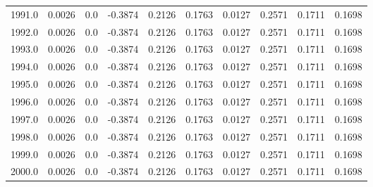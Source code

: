 \begin{longtable}{lrrrrrrrrr}
1991.0 & 0.0026 & 0.0 & -0.3874 & 0.2126 & 0.1763 & 0.0127 & 0.2571 & 0.1711 & 0.1698 \\
1992.0 & 0.0026 & 0.0 & -0.3874 & 0.2126 & 0.1763 & 0.0127 & 0.2571 & 0.1711 & 0.1698 \\
1993.0 & 0.0026 & 0.0 & -0.3874 & 0.2126 & 0.1763 & 0.0127 & 0.2571 & 0.1711 & 0.1698 \\
1994.0 & 0.0026 & 0.0 & -0.3874 & 0.2126 & 0.1763 & 0.0127 & 0.2571 & 0.1711 & 0.1698 \\
1995.0 & 0.0026 & 0.0 & -0.3874 & 0.2126 & 0.1763 & 0.0127 & 0.2571 & 0.1711 & 0.1698 \\
1996.0 & 0.0026 & 0.0 & -0.3874 & 0.2126 & 0.1763 & 0.0127 & 0.2571 & 0.1711 & 0.1698 \\
1997.0 & 0.0026 & 0.0 & -0.3874 & 0.2126 & 0.1763 & 0.0127 & 0.2571 & 0.1711 & 0.1698 \\
1998.0 & 0.0026 & 0.0 & -0.3874 & 0.2126 & 0.1763 & 0.0127 & 0.2571 & 0.1711 & 0.1698 \\
1999.0 & 0.0026 & 0.0 & -0.3874 & 0.2126 & 0.1763 & 0.0127 & 0.2571 & 0.1711 & 0.1698 \\
2000.0 & 0.0026 & 0.0 & -0.3874 & 0.2126 & 0.1763 & 0.0127 & 0.2571 & 0.1711 & 0.1698 \\
\end{longtable}